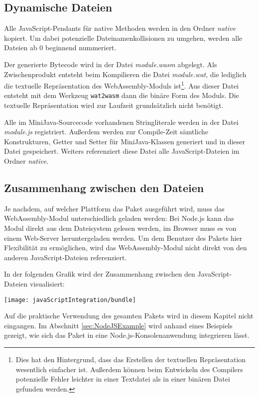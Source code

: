 \subsection{Dynamische Dateien}

Alle JavaScript-Pendants für native Methoden werden in den Ordner \emph{native} kopiert. Um dabei potenzielle Dateinamenkollisionen zu umgehen, werden alle Dateien ab 0 beginnend nummeriert.

Der generierte Bytecode wird in der Datei \emph{module.wasm} abgelegt. Als Zwischenprodukt entsteht beim Kompilieren die Datei \emph{module.wat}, die lediglich die textuelle Repräsentation des WebAssembly-Moduls ist\footnote{Dies hat den Hintergrund, dass das Erstellen der textuellen Repräsentation wesentlich einfacher ist. Außerdem können beim Entwickeln des Compilers potenzielle Fehler leichter in einer Textdatei als in einer binären Datei gefunden werden.}. Aus dieser Datei entsteht mit dem Werkzeug \lstinline{wat2wasm}\cite{WABT} dann die binäre Form des Moduls. Die textuelle Repräsentation wird zur Laufzeit grundsätzlich nicht benötigt.

Alle im MiniJava-Sourcecode vorhandenen Stringliterale werden in der Datei \emph{module.js} registriert. Außerdem werden zur Compile-Zeit sämtliche Konstrukturen, Getter und Setter für MiniJava-Klassen generiert und in dieser Datei gespeichert. Weiters referenziert diese Datei alle JavaScript-Dateien im Ordner \emph{native}.

\subsection{Zusammenhang zwischen den Dateien}

Je nachdem, auf welcher Plattform das Paket ausgeführt wird, muss das WebAssembly-Modul unterschiedlich geladen werden: Bei Node.js kann das Modul direkt aus dem Dateisystem gelesen werden, im Browser muss es von einem Web-Server heruntergeladen werden. Um dem Benutzer des Pakets hier Flexibilität zu ermöglichen, wird das WebAssembly-Modul nicht direkt von den anderen JavaScript-Dateien referenziert.

In der folgenden Grafik wird der Zusammenhang zwischen den JavaScript-Dateien visualisiert:

\begin{center}
    \texttt{[image: javaScriptIntegration/bundle]}
\end{center}

Auf die praktische Verwendung des gesamten Pakets wird in diesem Kapitel nicht eingangen. Im Abschnitt \ref{sec:NodeJSExample} wird anhand eines Beispiels gezeigt, wie sich das Paket in eine Node.js-Konsolenanwendung integrieren lässt.

